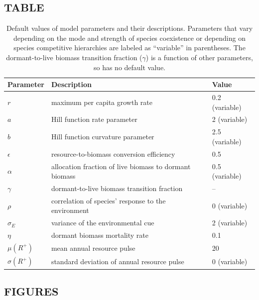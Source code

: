 \documentclass[12pt,]{article}
\begin{document}
\newpage{}

\subsection{TABLE}\label{table}

\begin{table}[!htbp]
\footnotesize
\caption{Default values of model parameters and their descriptions. Parameters that vary depending on the mode and strength of species coexistence or depending on species competitive hierarchies are labeled as ``variable'' in parentheses. The dormant-to-live biomass transition fraction ($\gamma$) is a function of other parameters, so has no default value.}
\begin{tabular}{l l l}
\hline
Parameter & Description & Value \\
\hline
$r$ & maximum per capita growth rate & 0.2 (variable) \\
$a$ & Hill function rate parameter & 2 (variable) \\
$b$ & Hill function curvature parameter & 2.5 (variable) \\
$\epsilon$ & resource-to-biomass conversion efficiency & 0.5 \\
$\alpha$ & allocation fraction of live biomass to dormant biomass & 0.5 (variable) \\
$\gamma$ & dormant-to-live biomass transition fraction & -- \\
$\rho$ & correlation of species' response to the environment & 0 (variable) \\
$\sigma_E$ & variance of the environmental cue & 2 (variable) \\
$\eta$ & dormant biomass mortality rate & 0.1 \\
$\mu(R^+)$ & mean annual resource pulse & 20 \\
$\sigma(R^+)$ & standard deviation of annual resource pulse & 0 (variable) \\
\hline
\end{tabular}
\end{table}

\newpage{}

\subsection{FIGURES}\label{figures}
\end{document}
